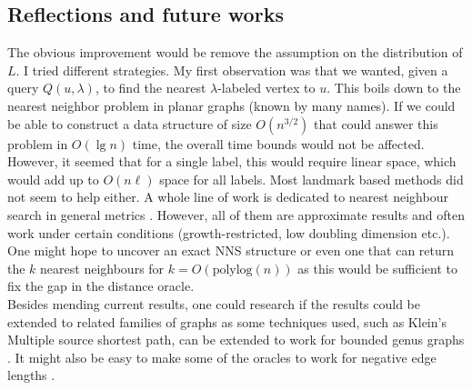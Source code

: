 \subsection{Reflections and future works}
The obvious improvement would be remove the assumption on the distribution of $L$. I
tried different strategies. My first observation was that we wanted, given a query
$Q(u,\lambda)$, to find the nearest $\lambda$-labeled vertex to $u$. This boils down to
the nearest neighbor problem in planar graphs (known by many names). If we could be able to construct a data structure
of size $O(n^{3/2})$ that could answer this problem in $O(\lg n)$ time, the overall time
bounds would not be affected. However, it seemed that for a single label, this would
require linear space, which would add up to $O(n\ell)$ space for all labels. Most
landmark based methods did not seem to help either. A whole line of work is dedicated to
nearest neighbour search in general metrics
\cite{krauthgamer2004navigating}\cite{krauthgamer2005black}\cite{karger2002finding}\cite{plaxton1999accessing}\cite{beygelzimer2006cover}\cite{cole2006searching}.
However, all of them are approximate results and often work under certain conditions
(growth-restricted, low doubling dimension etc.). One might hope to uncover an exact NNS
structure or even one that can return the $k$ nearest neighbours for
$k=O(\text{polylog}(n))$ as this would be sufficient to fix the gap in the distance
oracle. \\
Besides mending current results, one could research if the results could be extended to related
families of graphs as some techniques used, such as Klein's Multiple source shortest path, can
be extended to work for bounded genus graphs \cite{cabello2007multiple}. It might also be
easy to make some of the oracles to work for negative edge lengths
\cite{kaplan2012submatrix}.
